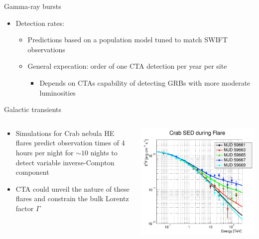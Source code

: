 \begin{frame}{Gamma-ray bursts}
  \begin{itemize}
    \item [] Detection rates:
    \begin{itemize}
      \item Predictions based on a population model tuned to match SWIFT observations
      \item General expecation: order of one CTA detection per year per site
      \begin{itemize}
        \item [\to] Depends on CTAs capability of detecting GRBs with more moderate luminosities
      \end{itemize}
    \end{itemize}
  \end{itemize}
\end{frame}

\begin{frame}{Galactic transients}
  \begin{columns}
      \begin{column}{0.6\textwidth}
        \begin{itemize}
          \item Simulations for Crab nebula HE flares predict observation times of 4 hours per night for $\sim\num{10}$ nights to detect variable inverse-Compton component
          \item CTA could unveil the nature of these flares and constrain the bulk Lorentz factor $\Gamma$
        \end{itemize}
      \end{column}%
      \begin{column}{0.38\textwidth}
        \centering
        \includegraphics[height=0.85\textwidth]{Plots/crab_sim.png}
      \end{column}%
  \end{columns}
\end{frame}

